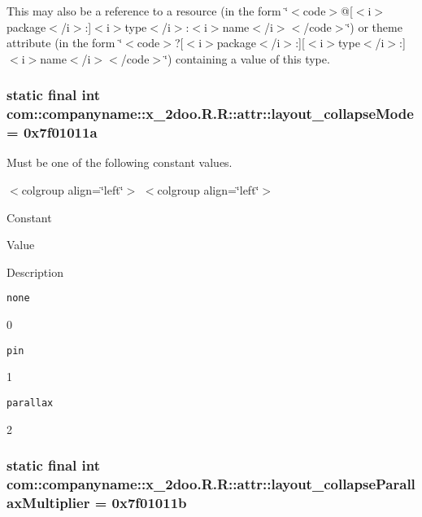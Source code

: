 This may also be a reference to a resource (in the form \char`\"{}$<$code$>$@\mbox{[}$<$i$>$package$<$/i$>$:\mbox{]}$<$i$>$type$<$/i$>$:$<$i$>$name$<$/i$>$$<$/code$>$\char`\"{}) or theme attribute (in the form \char`\"{}$<$code$>$?\mbox{[}$<$i$>$package$<$/i$>$:\mbox{]}\mbox{[}$<$i$>$type$<$/i$>$:\mbox{]}$<$i$>$name$<$/i$>$$<$/code$>$\char`\"{}) containing a value of this type. \hypertarget{classcom_1_1companyname_1_1x__2doo_1_1_r_1_1attr_d88df0ec745d345be0dff9888be8c389}{
\subsubsection[{layout\_\-collapseMode}]{\setlength{\rightskip}{0pt plus 5cm}static final int com::companyname::x\_\-2doo.R.R::attr::layout\_\-collapseMode = 0x7f01011a}}
\label{classcom_1_1companyname_1_1x__2doo_1_1_r_1_1attr_d88df0ec745d345be0dff9888be8c389}


Must be one of the following constant values. \begin{TabularC}{0}
\hline
\end{TabularC}
$<$colgroup align=\char`\"{}left\char`\"{}$>$ $<$colgroup align=\char`\"{}left\char`\"{}$>$ 

Constant

Value

Description 

{\tt none}

0

{\tt pin}

1

{\tt parallax}

2\hypertarget{classcom_1_1companyname_1_1x__2doo_1_1_r_1_1attr_7c76470a91344ee8f21464e64bcabc7f}{
\subsubsection[{layout\_\-collapseParallaxMultiplier}]{\setlength{\rightskip}{0pt plus 5cm}static final int com::companyname::x\_\-2doo.R.R::attr::layout\_\-collapseParallaxMultiplier = 0x7f01011b}}
\label{classcom_1_1companyname_1_1x__2doo_1_1_r_1_1attr_7c76470a91344ee8f21464e64bcabc7f}



